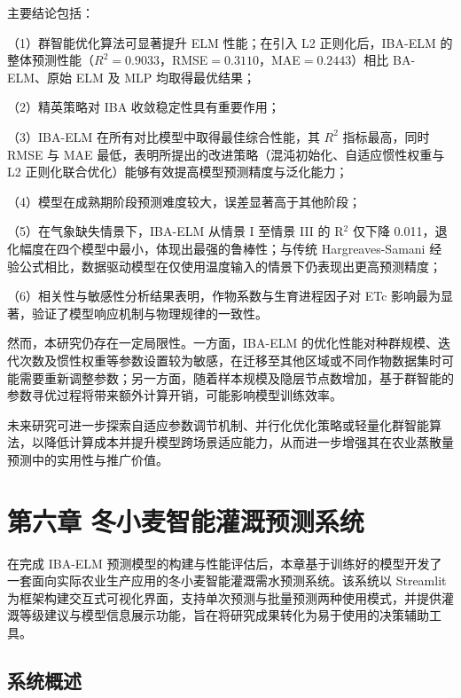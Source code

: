 \documentclass[11pt]{article}
\begin{document}
主要结论包括：

（1）群智能优化算法可显著提升 ELM 性能；在引入 L2 正则化后，IBA-ELM 的整体预测性能（$R^2=0.9033$，RMSE$=0.3110$，MAE$=0.2443$）相比 BA-ELM、原始 ELM 及 MLP 均取得最优结果；

（2）精英策略对 IBA 收敛稳定性具有重要作用；

（3）IBA-ELM 在所有对比模型中取得最佳综合性能，其 $R^2$ 指标最高，同时 RMSE 与 MAE 最低，表明所提出的改进策略（混沌初始化、自适应惯性权重与 L2 正则化联合优化）能够有效提高模型预测精度与泛化能力；

（4）模型在成熟期阶段预测难度较大，误差显著高于其他阶段；

（5）在气象缺失情景下，IBA-ELM 从情景 I 至情景 III 的 R$^2$ 仅下降 0.011，退化幅度在四个模型中最小，体现出最强的鲁棒性；与传统 Hargreaves-Samani 经验公式相比，数据驱动模型在仅使用温度输入的情景下仍表现出更高预测精度；

（6）相关性与敏感性分析结果表明，作物系数与生育进程因子对 ETc 影响最为显著，验证了模型响应机制与物理规律的一致性。

然而，本研究仍存在一定局限性。一方面，IBA-ELM 的优化性能对种群规模、迭代次数及惯性权重等参数设置较为敏感，在迁移至其他区域或不同作物数据集时可能需要重新调整参数；另一方面，随着样本规模及隐层节点数增加，基于群智能的参数寻优过程将带来额外计算开销，可能影响模型训练效率。

未来研究可进一步探索自适应参数调节机制、并行化优化策略或轻量化群智能算法，以降低计算成本并提升模型跨场景适应能力，从而进一步增强其在农业蒸散量预测中的实用性与推广价值。


\newpage
\section{第六章 冬小麦智能灌溉预测系统}
\label{ch:system}

在完成 IBA-ELM 预测模型的构建与性能评估后，本章基于训练好的模型开发了一套面向实际农业生产应用的冬小麦智能灌溉需水预测系统。该系统以 Streamlit 为框架构建交互式可视化界面，支持单次预测与批量预测两种使用模式，并提供灌溉等级建议与模型信息展示功能，旨在将研究成果转化为易于使用的决策辅助工具。

\subsection{系统概述}
\label{sec:sys_overview}
\end{document}
